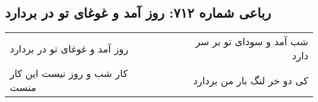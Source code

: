 \begin{center}
\section*{رباعی شماره ۷۱۲: روز آمد و غوغای تو در بردارد}
\label{sec:0712}
\begin{longtable}{l p{0.5cm} r}
روز آمد و غوغای تو در بردارد
&&
شب آمد و سودای تو بر سر دارد
\\
کار شب و روز نیست این کار منست
&&
کی دو خر لنگ بار من بردارد
\\
\end{longtable}
\end{center}

